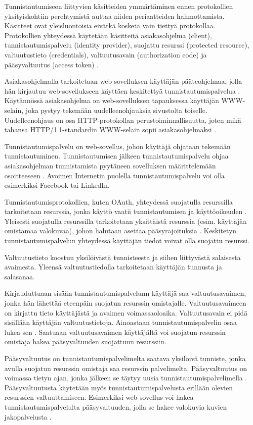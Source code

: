 Tunnistautumiseen liittyvien käsitteiden ymmärtäminen ennen protokollien yksityiskohtiin perehtymistä auttaa niiden periaatteiden hahmottamista. Käsitteet ovat yleisluontoisia eivätkä kosketa vain tiettyä protokollaa. Protokollien yhteydessä käytetään käsitteitä asiakasohjelma (client), tunnistautumispalvelu (identity provider), suojattu resurssi (protected resource), valtuutustieto (credentials), valtuutusavain (authorization code) ja pääsyvaltuutus (access token) \cite{nisti}.

Asiakasohjelmalla tarkoitetaan web-sovelluksen käyttäjän pääteohjelmaa, jolla hän kirjautuu web-sovellukseen käyttäen keskitettyä tunnistautumispalvelua \cite{nisti}. Käytännössä asiakasohjelma on web-sovelluksen tapauksessa käyttäjän WWW-se\-lain, joka pystyy tekemään uudelleenohjauksia sivustolta toiselle. Uudelleenohjaus on osa HTTP-pro\-to\-kol\-lan perustoiminnallisuutta, joten mikä tahansa HTTP/1.1-stan\-dar\-din WWW-\-se\-lain sopii asiakasohjelmaksi \cite{rfc2616}.

Tunnistautumispalvelu on web-sovellus, johon käyttäjä ohjataan tekemään tunnistautuminen. Tunnistautumisen jälkeen tunnistautumispalvelu ohjaa asia\-kas\-oh\-jel\-man tunnistamista pyytäneen sovelluksen määrittelemään osoit\-tee\-seen \cite{nisti}. Avoimen Internetin puolella tunnistautumispalvelu voi olla esimerkiksi Facebook tai LinkedIn.

Tunnistautumisprotokollien, kuten OAuth, yhteydessä suojatulla resurssilla tarkoitetaan resurssia, jonka käyttö vaatii tunnistautumisen ja käyttöoikeuden \cite{oauth2_0}. Yleisesti suojatulla resurssilla tarkoitetaan yksittäistä resurssia (esim. käyttäjän omistamaa valokuvaa), johon halutaan asettaa pääsyrajoituksia \cite{nisti}. Keskitetyn tunnistautumispalvelun yhteydessä käyttäjän tiedot voivat olla suojattu resurssi.

Valtuutustieto koostuu yksilöivästä tunnisteesta ja siihen liittyvästä salaisesta avaimesta. Yleensä valtuutustiedolla tarkoitetaan käyttäjän tunnusta ja salasanaa.

Kirjauduttuaan sisään tunnistautumispalvelunn käyttäjä saa valtuutusavaimen, jonka hän lähettää eteenpäin suojatun resurssin omistajalle. Valtuutusavaimeen on kirjattu tieto käyttäjästä ja avaimen voimassaoloaika. Valtuutusavain ei pidä sisällään käyttäjän valtuutustietoja. Ainoastaan tunnistautumispalvelin osaa lukea sen \cite{nisti}. Saatuaan valtuutusavaimen käyttäjältä voi suojatun resurssin omistaja hakea pääsyvaltuuden suojattuun resurssiin.

Pääsyvaltuutus on tunnistautumispalvelimelta saatava yksilöivä tunniste, jonka avulla suojatun resurssin omistaja saa resurssin palvelimelta. Pääsyvaltuutus on voimassa tietyn ajan, jonka jälkeen se täytyy uusia tunnistautumispalvelimella \cite{nisti}. Pääsyvaltuutusta käytetään myös tunnistautumispalvelusta erillään olevien resurssien valtuuttamiseen. Esimerkiksi web-sovellus voi hakea tunnistautumispalvelulta pääsyvaltuuden, jolla se hakee valokuvia kuvien jakopalvelusta \cite{facebook}.